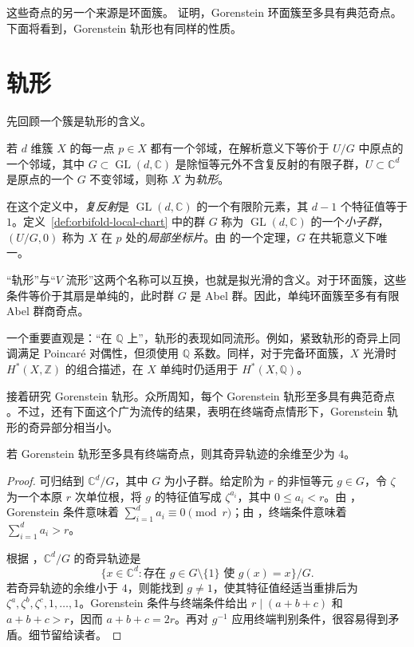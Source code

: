 这些奇点的另一个来源是环面簇。 证明，Gorenstein 环面簇至多具有典范奇点。下面将看到，Gorenstein 轨形也有同样的性质。

\section{轨形}\label{sec:orbifolds}
先回顾一个簇是轨形的含义。
\begin{definition}\label{def:orbifold-local-chart}
若 $d$ 维簇 $X$ 的每一点 $p\in X$ 都有一个邻域，在解析意义下等价于 $U/G$ 中原点的一个邻域，其中 $G\subset\operatorname{GL}(d,\mathbb C)$ 是除恒等元外不含复反射的有限子群，$U\subset\mathbb C^d$ 是原点的一个 $G$ 不变邻域，则称 $X$ 为\emph{轨形}。
\end{definition}

在这个定义中，\emph{复反射}是 $\operatorname{GL}(d,\mathbb C)$ 的一个有限阶元素，其 $d-1$ 个特征值等于 $1$。定义~\ref{def:orbifold-local-chart} 中的群 $G$ 称为 $\operatorname{GL}(d,\mathbb C)$ 的一个\emph{小子群}，$(U/G,0)$ 称为 $X$ 在 $p$ 处的\emph{局部坐标片}。由  的一个定理，$G$ 在共轭意义下唯一。

“轨形”与“$V$ 流形”这两个名称可以互换，也就是拟光滑的含义。对于环面簇，这些条件等价于其扇是单纯的，此时群 $G$ 是 Abel 群。因此，单纯环面簇至多有有限 Abel 群商奇点。

一个重要直观是：“在 $\mathbb Q$ 上”，轨形的表现如同流形。例如，紧致轨形的奇异上同调满足 Poincaré 对偶性，但须使用 $\mathbb Q$ 系数。同样，对于完备环面簇，$X$ 光滑时 $H^*(X,\mathbb Z)$ 的组合描述，在 $X$ 单纯时仍适用于 $H^*(X,\mathbb Q)$。

接着研究 Gorenstein 轨形。众所周知，每个 Gorenstein 轨形至多具有典范奇点 。不过，还有下面这个广为流传的结果，表明在终端奇点情形下，Gorenstein 轨形的奇异部分相当小。
\begin{proposition}\label{prop:terminal-gorenstein-orbifold-codimension}
若 Gorenstein 轨形至多具有终端奇点，则其奇异轨迹的余维至少为 $4$。
\end{proposition}
\begin{proof}
可归结到 $\mathbb C^d/G$，其中 $G$ 为小子群。给定阶为 $r$ 的非恒等元 $g\in G$，令 $\zeta$ 为一个本原 $r$ 次单位根，将 $g$ 的特征值写成 $\zeta^{a_i}$，其中 $0\leq a_i<r$。由 ，Gorenstein 条件意味着 $\sum_{i=1}^d a_i\equiv0\pmod r$；由 ，终端条件意味着 $\sum_{i=1}^d a_i>r$。

根据 ，$\mathbb C^d/G$ 的奇异轨迹是
\[
\{x\in\mathbb C^d:\text{存在 }g\in G\setminus\{1\}\text{ 使 }g(x)=x\}/G.
\]
若奇异轨迹的余维小于 $4$，则能找到 $g\ne1$，使其特征值经适当重排后为 $\zeta^a,\zeta^b,\zeta^c,1,\ldots,1$。Gorenstein 条件与终端条件给出 $r\mid(a+b+c)$ 和 $a+b+c>r$，因而 $a+b+c=2r$。再对 $g^{-1}$ 应用终端判别条件，很容易得到矛盾。细节留给读者。
\end{proof}

